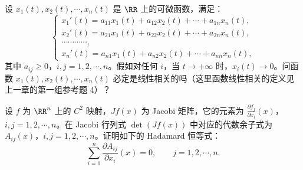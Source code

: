 \begin{xreferenceproblem}[9]
设 $x_1(t),x_2(t),\cdots,x_n(t)$ 是 $\RR$ 上的可微函数，满足：
  \[
    \begin{cases}
      x_1'(t)=a_{11}x_1(t)+a_{12}x_2(t)+\cdots+a_{1n}x_n(t),\\
      x_2'(t)=a_{21}x_1(t)+a_{22}x_2(t)+\cdots+a_{2n}x_n(t),\\
      \cdots\cdots\cdots\cdots,\\
      x_n'(t)=a_{n1}x_1(t)+a_{n2}x_2(t)+\cdots+a_{nn}x_n(t),
    \end{cases}
  \]
  其中 $a_{ij}\ge0$，$i,j=1,2,\cdots,n$。假如对任何 $i$，当 $t\to+\infty$ 时，$x_i(t)\to0$。问函数 $x_1(t),x_2(t),\cdots,x_n(t)$ 必定是线性相关的吗（这里函数线性相关的定义见上一章的第一组参考题 4）？
\end{xreferenceproblem}

\begin{xreferenceproblem}[10]
设 $f$ 为 $\RR^n$ 上的 $C^2$ 映射，$Jf(x)$ 为 Jacobi 矩阵，它的元素为 $\frac{\partial f_j}{\partial x_i}(x)$，$i,j=1,2,\cdots,n$。在 Jacobi 行列式 $\det(Jf(x))$ 中对应的代数余子式为 $A_{ij}(x)$，$i,j=1,2,\cdots,n$。证明如下的 Hadamard 恒等式：
  \[
    \sum_{i=1}^n\frac{\partial A_{ij}}{\partial x_i}(x)=0,
    \qquad j=1,2,\cdots,n.
  \]
\end{xreferenceproblem}
